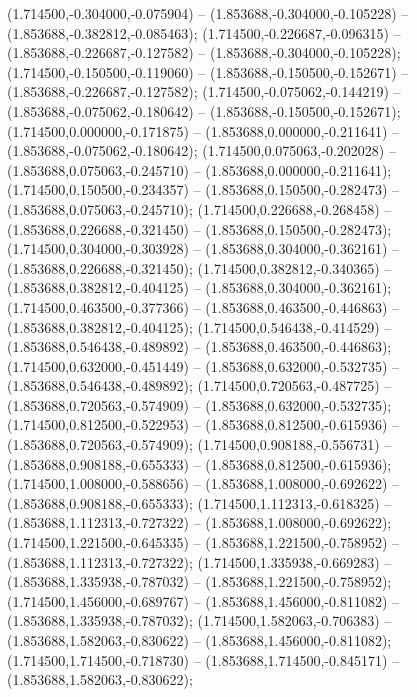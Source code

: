  (1.714500,-0.304000,-0.075904) -- (1.853688,-0.304000,-0.105228) -- (1.853688,-0.382812,-0.085463);
 (1.714500,-0.226687,-0.096315) -- (1.853688,-0.226687,-0.127582) -- (1.853688,-0.304000,-0.105228);
 (1.714500,-0.150500,-0.119060) -- (1.853688,-0.150500,-0.152671) -- (1.853688,-0.226687,-0.127582);
 (1.714500,-0.075062,-0.144219) -- (1.853688,-0.075062,-0.180642) -- (1.853688,-0.150500,-0.152671);
 (1.714500,0.000000,-0.171875) -- (1.853688,0.000000,-0.211641) -- (1.853688,-0.075062,-0.180642);
 (1.714500,0.075063,-0.202028) -- (1.853688,0.075063,-0.245710) -- (1.853688,0.000000,-0.211641);
 (1.714500,0.150500,-0.234357) -- (1.853688,0.150500,-0.282473) -- (1.853688,0.075063,-0.245710);
 (1.714500,0.226688,-0.268458) -- (1.853688,0.226688,-0.321450) -- (1.853688,0.150500,-0.282473);
 (1.714500,0.304000,-0.303928) -- (1.853688,0.304000,-0.362161) -- (1.853688,0.226688,-0.321450);
 (1.714500,0.382812,-0.340365) -- (1.853688,0.382812,-0.404125) -- (1.853688,0.304000,-0.362161);
 (1.714500,0.463500,-0.377366) -- (1.853688,0.463500,-0.446863) -- (1.853688,0.382812,-0.404125);
 (1.714500,0.546438,-0.414529) -- (1.853688,0.546438,-0.489892) -- (1.853688,0.463500,-0.446863);
 (1.714500,0.632000,-0.451449) -- (1.853688,0.632000,-0.532735) -- (1.853688,0.546438,-0.489892);
 (1.714500,0.720563,-0.487725) -- (1.853688,0.720563,-0.574909) -- (1.853688,0.632000,-0.532735);
 (1.714500,0.812500,-0.522953) -- (1.853688,0.812500,-0.615936) -- (1.853688,0.720563,-0.574909);
 (1.714500,0.908188,-0.556731) -- (1.853688,0.908188,-0.655333) -- (1.853688,0.812500,-0.615936);
 (1.714500,1.008000,-0.588656) -- (1.853688,1.008000,-0.692622) -- (1.853688,0.908188,-0.655333);
 (1.714500,1.112313,-0.618325) -- (1.853688,1.112313,-0.727322) -- (1.853688,1.008000,-0.692622);
 (1.714500,1.221500,-0.645335) -- (1.853688,1.221500,-0.758952) -- (1.853688,1.112313,-0.727322);
 (1.714500,1.335938,-0.669283) -- (1.853688,1.335938,-0.787032) -- (1.853688,1.221500,-0.758952);
 (1.714500,1.456000,-0.689767) -- (1.853688,1.456000,-0.811082) -- (1.853688,1.335938,-0.787032);
 (1.714500,1.582063,-0.706383) -- (1.853688,1.582063,-0.830622) -- (1.853688,1.456000,-0.811082);
 (1.714500,1.714500,-0.718730) -- (1.853688,1.714500,-0.845171) -- (1.853688,1.582063,-0.830622);
